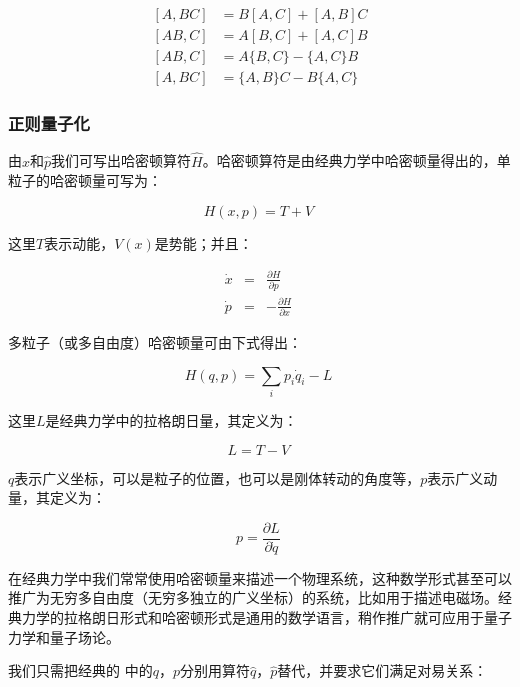 \begin{align}
  \left[A, BC \right] &= B \left[A, C \right] + \left[A,B \right]C \\
  \left[AB, C \right] &= A \left[B,C \right] + \left[A, C \right]
  B \\
  \left[AB,C \right]  &= A \{ B,C \}- \{ A, C \} B \\
  \left[A, BC \right] &= \{A , B \} C- B \{A , C \}~
\end{align}

\subsubsection{正则量子化}

由$\hat x$和$\hat p$我们可写出哈密顿算符$\hat H$。哈密顿算符是由经典力学中哈密顿量得出的，单粒子的哈密顿量可写为：

\begin{equation}
H(x,p)=T+V~
\end{equation}

这里$T$表示动能，$V(x)$是势能；并且：

\begin{align}
\dot x &=& \frac{\partial H}{\partial p}  \\
\dot p &=& - \frac{\partial H}{\partial x}~
\end{align}

多粒子（或多自由度）哈密顿量可由下式得出：

\begin{equation}
H(q,p) = \sum\limits_i p_i \dot q_i - L~
\end{equation}

这里$L$是经典力学中的拉格朗日量，其定义为：

\begin{equation}
L = T-V~
\end{equation}

$q$表示广义坐标，可以是粒子的位置，也可以是刚体转动的角度等，$p$表示广义动量，其定义为：

\begin{equation}
p = \frac{\partial L}{\partial \dot q}~
\end{equation}

在经典力学中我们常常使用哈密顿量来描述一个物理系统，这种数学形式甚至可以推广为无穷多自由度（无穷多独立的广义坐标）的系统，比如用于描述电磁场。经典力学的拉格朗日形式和哈密顿形式是通用的数学语言，稍作推广就可应用于量子力学和量子场论。

我们只需把经典的 中的$q$，$p$分别用算符$\hat q$，$\hat p$替代，并要求它们满足对易关系：

